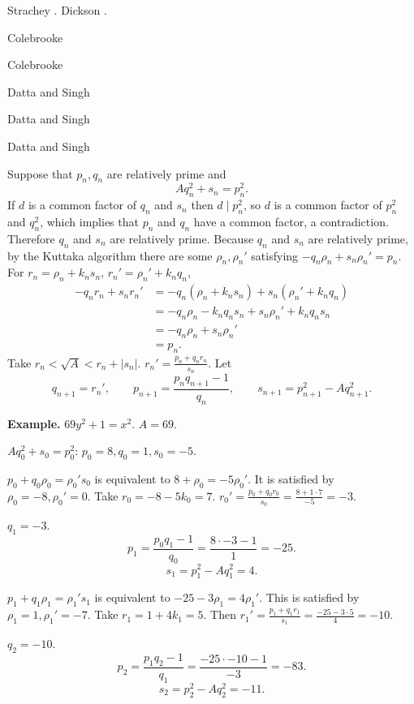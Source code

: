 \documentclass{article}
\theoremstyle{definition}
\theoremstyle{definition}
\begin{document}
Strachey \cite[pp.~36--53]{strachey}. Dickson \cite[pp.~349--350]{dicksonII}.

Colebrooke \cite[pp.~170--184]{colebrooke}

Colebrooke \cite[pp.~363--372]{colebrooke}

Datta and Singh \cite[II, pp.~93--99]{datta}

Datta and Singh \cite[II, pp.~146--161]{datta}

Datta and Singh \cite[II, pp.~161--172]{datta}

Suppose that $p_n,q_n$ are relatively prime and
\[
Aq_n^2+s_n=p_n^2.
\]
If $d$ is a common factor of $q_n$ and $s_n$ then $d \mid p_n^2$, so
$d$ is a common factor of $p_n^2$ and $q_n^2$,
which implies that $p_n$ and $q_n$ have a common factor, a contradiction.
Therefore $q_n$ and $s_n$ are relatively prime. 
Because $q_n$ and $s_n$ are relatively prime, 
by the Kuttaka algorithm
there are some $\rho_n,\rho_n'$ satisfying 
$-q_n \rho_n + s_n \rho_n' = p_n$.
For $r_n=\rho_n+k_n s_n$, $r_n'=\rho_n'+k_nq_n$,
\begin{align*}
-q_nr_n+s_nr_n'&=-q_n(\rho_n+k_ns_n)+s_n(\rho_n'+k_nq_n)\\
&= -q_n\rho_n-k_nq_ns_n+s_n\rho_n'+k_nq_ns_n\\
&=-q_n\rho_n+s_n\rho_n'\\
&=p_n.
\end{align*}
Take
$r_n<\sqrt{A}<r_n+|s_n|$.
$r_n' = \frac{p_n+q_nr_n}{s_n}$.
Let
\[
q_{n+1}=r_n', \qquad p_{n+1}=\frac{p_nq_{n+1}-1}{q_n},
\qquad
s_{n+1}=p_{n+1}^2-Aq_{n+1}^2.
\] 







\textbf{Example.}
$69y^2+1=x^2$.
$A=69$. 

$Aq_0^2+s_0=p_0^2$: $p_0=8, q_0=1, s_0=-5$. 

$p_0+q_0\rho_0=\rho_0's_0$ is equivalent to
$8+\rho_0=-5\rho_0'$. It is satisfied by 
$\rho_0=-8, \rho_0'=0$.
Take
$r_0=-8-5k_0= 7$.
$r_0'= \frac{p_0+q_0r_0}{s_0}
=\frac{8 +1 \cdot 7}{-5} = -3$. 

$q_1=-3$. 
\[
p_1 =\frac{p_0q_1-1}{q_0} = \frac{8 \cdot -3 - 1}{1} = -25.
\]
\[
s_1=p_1^2 - Aq_1^2 = 4.
\] 

$p_1+q_1\rho_1=\rho_1's_1$ is equivalent to
$-25 -3\rho_1 = 4\rho_1'$. This is satisfied
by $\rho_1=1, \rho_1'=-7$.
Take $r_1 =1+4k_1 = 5$.
Then
$r_1'=\frac{p_1+q_1r_1}{s_1} = \frac{-25 -3 \cdot 5}{4} = -10$. 

$q_2=-10$.
\[
p_2 = \frac{p_1q_2-1}{q_1} = \frac{-25 \cdot -10 - 1}{-3} = 
-83.
\]
\[
s_2 = p_2^2-Aq_2^2 = -11.
\]
\end{document}
